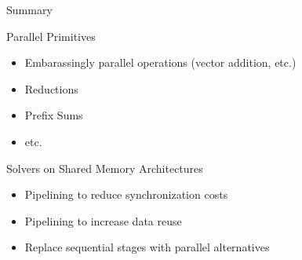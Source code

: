
\begin{frame}{Summary}

 \begin{block}{Parallel Primitives}
   \begin{itemize}
    \item Embarassingly parallel operations (vector addition, etc.)
    \item Reductions
    \item Prefix Sums
    \item etc.
   \end{itemize}
 \end{block}

 \begin{block}{Solvers on Shared Memory Architectures}
   \begin{itemize}
    \item Pipelining to reduce synchronization costs
    \item Pipelining to increase data reuse
    \item Replace sequential stages with parallel alternatives
   \end{itemize}
 \end{block}

\end{frame}

